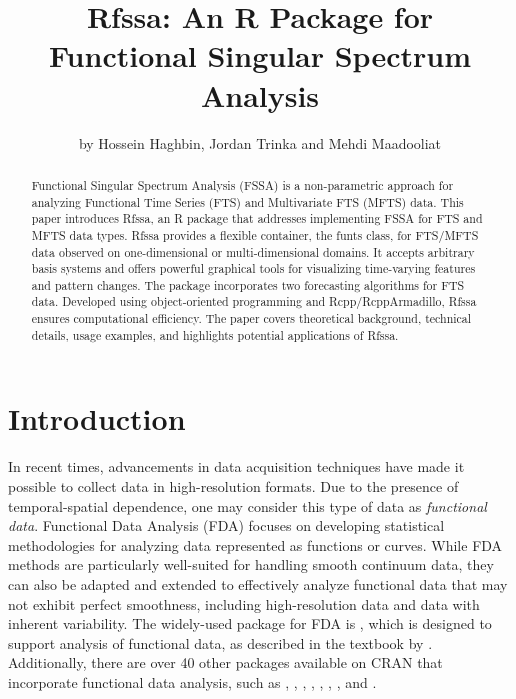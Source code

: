 
\title{Rfssa: An R Package for Functional Singular Spectrum Analysis}
\author{by Hossein Haghbin, Jordan Trinka and Mehdi Maadooliat}

\maketitle

\begin{abstract}
Functional Singular Spectrum Analysis (FSSA) is a non-parametric approach for analyzing Functional Time Series (FTS) and Multivariate FTS (MFTS) data. This paper introduces Rfssa, an R package that addresses implementing FSSA for FTS and MFTS data types. Rfssa provides a flexible container, the funts class, for FTS/MFTS data observed on one-dimensional or multi-dimensional domains. It accepts arbitrary basis systems and offers powerful graphical tools for visualizing time-varying features and pattern changes. The package incorporates two forecasting algorithms for FTS data. Developed using object-oriented programming and Rcpp/RcppArmadillo, Rfssa ensures computational efficiency. The paper covers theoretical background, technical details, usage examples, and highlights potential applications of Rfssa.\end{abstract}

\section{Introduction}\label{sec:introduction}
In recent times, advancements in data acquisition techniques have made it possible to collect data in high-resolution formats. Due to the presence of temporal-spatial dependence, one may consider this type of data as \textit{functional data}. 
Functional Data Analysis (FDA) focuses on developing statistical methodologies for analyzing data represented as functions or curves. While FDA methods are particularly well-suited for handling smooth continuum data, they can also be adapted and extended to effectively analyze functional data that may not exhibit perfect smoothness, including high-resolution data and data with inherent variability.
The widely-used  package for FDA is  \citep{fdapackage}, which is designed to support analysis of functional data, as described in the textbook by \cite{ramsay2005}. Additionally, there are over 40 other  packages available on CRAN that incorporate functional data analysis, such as  \citep{funFEMpackage},  \citep{fdauscpackage},  \citep{refundpackage},  \citep{fdapacepackage},  \citep{funDatapackage},  \citep{ftsspecpackage},  \citep{rainbowpackage}, and  \citep{ftsapackage}.

